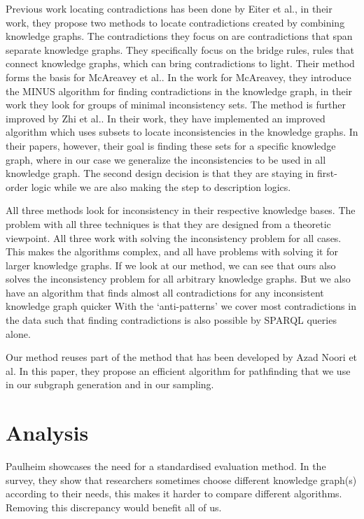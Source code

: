 \documentclass[11pt,letterpaper ,oneside ]{book}
\begin{document}
	Previous work locating contradictions has been done by Eiter et al.\cite{Eiter:2010}, in their work, they propose two methods to locate contradictions created by combining knowledge graphs. The contradictions they focus on are contradictions that span separate knowledge graphs. They specifically focus on the bridge rules, rules that connect knowledge graphs, which can bring contradictions to light. Their method forms the basis for McAreavey et al.\cite{McAreavey:2014}. In the work for McAreavey, they introduce the MINUS algorithm for finding contradictions in the knowledge graph, in their work they look for groups of minimal inconsistency sets. The method is further improved by Zhi et al.\cite{Zhi:2015}. In their work, they have implemented an improved algorithm which uses subsets to locate inconsistencies in the knowledge graphs. In their papers, however, their goal is finding these sets for a specific knowledge graph, where in our case we generalize the inconsistencies to be used in all knowledge graph. The second design decision is that they are staying in first-order logic while we are also making the step to description logics.
	
	All three methods look for inconsistency in their respective knowledge bases. The problem with all three techniques is that they are designed from a theoretic viewpoint. All three work with solving the inconsistency problem for all cases. This makes the algorithms complex, and all have problems with solving it for larger knowledge graphs. If we look at our method, we can see that ours also solves the inconsistency problem for all arbitrary knowledge graphs. But we also have an algorithm that finds almost all contradictions for any inconsistent knowledge graph quicker With the `anti-patterns' we cover most contradictions in the data such that finding contradictions is also possible by SPARQL queries alone.
	
	Our method reuses part of the method that has been developed by Azad Noori et al\cite{Noori:2015}. In this paper, they propose an efficient algorithm for pathfinding that we use in our subgraph generation and in our sampling.
	
	\section{Analysis}
	Paulheim \cite{HeikoP:2016} showcases the need for a standardised evaluation method. In the survey, they show that researchers sometimes choose different knowledge graph(s) according to their needs, this makes it harder to compare different algorithms. Removing this discrepancy would benefit all of us.
	
\end{document}
